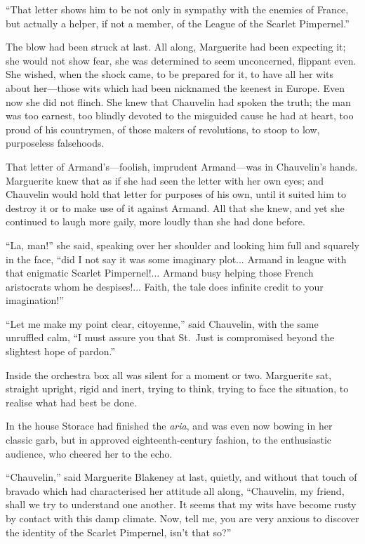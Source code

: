 \documentclass[paper=a5,BCOR=7mm,twoside,DIV=calc,12pt,usegeometry,chapterprefix,endperiod,headings=big]{scrbook}
\begin{document}
\enquote{That letter shows him to be not only in sympathy with the enemies of France, but actually a helper, if not a member, of the League of the Scarlet Pimpernel.}

The blow had been struck at last. All along, Marguerite had been expecting it; she would not show fear, she was determined to seem unconcerned, flippant even. She wished, when the shock came, to be prepared for it, to have all her wits about her---those wits which had been nicknamed the keenest in Europe. Even now she did not flinch. She knew that Chauvelin had spoken the truth; the man was too earnest, too blindly devoted to the misguided cause he had at heart, too proud of his countrymen, of those makers of revolutions, to stoop to low, purposeless falsehoods.

That letter of Armand's---foolish, imprudent Armand---was in Chauvelin's hands. Marguerite knew that as if she had seen the letter with her own eyes; and Chauvelin would hold that letter for purposes of his own, until it suited him to destroy it or to make use of it against Armand. All that she knew, and yet she continued to laugh more gaily, more loudly than she had done before.

\enquote{La, man!} she said, speaking over her shoulder and looking him full and squarely in the face, \enquote{did I not say it was some imaginary plot... Armand in league with that enigmatic Scarlet Pimpernel!... Armand busy helping those French aristocrats whom he despises!... Faith, the tale does infinite credit to your imagination!}

\enquote{Let me make my point clear, citoyenne,} said Chauvelin, with the same unruffled calm, \enquote{I must assure you that St.~Just is compromised beyond the slightest hope of pardon.}

Inside the orchestra box all was silent for a moment or two. Marguerite sat, straight upright, rigid and inert, trying to think, trying to face the situation, to realise what had best be done.

In the house Storace had finished the \textit{aria}, and was even now bowing in her classic garb, but in approved eighteenth-century fashion, to the enthusiastic audience, who cheered her to the echo.

\enquote{Chauvelin,} said Marguerite Blakeney at last, quietly, and without that touch of bravado which had characterised her attitude all along, \enquote{Chauvelin, my friend, shall we try to understand one another. It seems that my wits have become rusty by contact with this damp climate. Now, tell me, you are very anxious to discover the identity of the Scarlet Pimpernel, isn't that so?}
\end{document}
